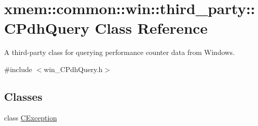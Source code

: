 \hypertarget{classxmem_1_1common_1_1win_1_1third__party_1_1_c_pdh_query}{}\section{xmem\+:\+:common\+:\+:win\+:\+:third\+\_\+party\+:\+:C\+Pdh\+Query Class Reference}
\label{classxmem_1_1common_1_1win_1_1third__party_1_1_c_pdh_query}


A third-\/party class for querying performance counter data from Windows.  




{\ttfamily \#include $<$win\+\_\+\+C\+Pdh\+Query.\+h$>$}

\subsection*{Classes}
\begin{DoxyCompactItemize}
\item 
class \hyperlink{classxmem_1_1common_1_1win_1_1third__party_1_1_c_pdh_query_1_1_c_exception}{C\+Exception}
\end{DoxyCompactItemize}
